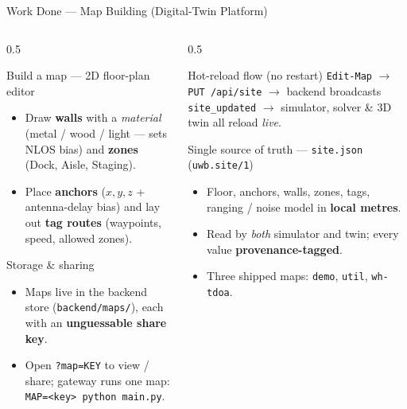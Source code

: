 \documentclass[aspectratio=169,10pt]{beamer}
\begin{document}
\begin{frame}{Work Done --- Map Building (Digital-Twin Platform)}
  \begin{columns}[T]
    \begin{column}{0.5\textwidth}
      \begin{block}{Build a map --- 2D floor-plan editor}
        \footnotesize
        \begin{itemize}\small
          \item Draw \textbf{walls} with a \emph{material} (metal / wood / light --- sets NLOS bias) and
                \textbf{zones} (Dock, Aisle, Staging).
          \item Place \textbf{anchors} ($x,y,z$ + antenna-delay bias) and lay out \textbf{tag routes}
                (waypoints, speed, allowed zones).
        \end{itemize}
      \end{block}
      \begin{block}{Storage \& sharing}
        \footnotesize
        \begin{itemize}\small
          \item Maps live in the backend store (\texttt{backend/maps/}), each with an
                \textbf{unguessable share key}.
          \item Open \texttt{?map=KEY} to view / share; gateway runs one map:
                \texttt{MAP=<key> python main.py}.
        \end{itemize}
      \end{block}
    \end{column}
    \begin{column}{0.5\textwidth}
      \begin{block}{Hot-reload flow (no restart)}
        \footnotesize \texttt{Edit-Map} $\rightarrow$ \texttt{PUT /api/site} $\rightarrow$ backend broadcasts
        \texttt{site\_updated} $\rightarrow$ simulator, solver \& 3D twin all reload \emph{live}.
      \end{block}
      \begin{block}{Single source of truth --- \texttt{site.json} (\texttt{uwb.site/1})}
        \footnotesize
        \begin{itemize}\small
          \item Floor, anchors, walls, zones, tags, ranging / noise model in \textbf{local metres}.
          \item Read by \emph{both} simulator and twin; every value \textbf{provenance-tagged}.
          \item Three shipped maps: \texttt{demo}, \texttt{util}, \texttt{wh-tdoa}.
        \end{itemize}
      \end{block}
    \end{column}
  \end{columns}
\end{frame}
\end{document}
